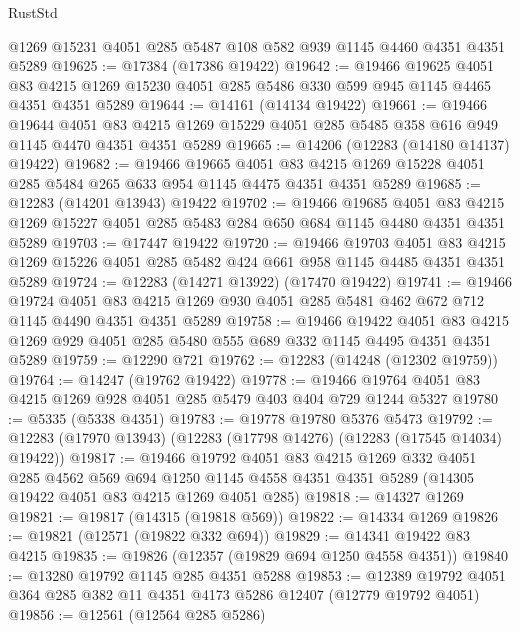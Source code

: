 \begin{lexlean}{RustStd}
\begin{coremodule}
    @1269
    @15231
    @4051
    @285
    @5487
    @108
    @582
    @939
    @1145
    @4460
    @4351
    @4351
    @5289
@19625 := @17384 (@17386 @19422)
@19642 := @19466
    @19625
    @4051
    @83
    @4215
    @1269
    @15230
    @4051
    @285
    @5486
    @330
    @599
    @945
    @1145
    @4465
    @4351
    @4351
    @5289
@19644 := @14161 (@14134 @19422)
@19661 := @19466
    @19644
    @4051
    @83
    @4215
    @1269
    @15229
    @4051
    @285
    @5485
    @358
    @616
    @949
    @1145
    @4470
    @4351
    @4351
    @5289
@19665 := @14206 (@12283 (@14180 @14137) @19422)
@19682 := @19466
    @19665
    @4051
    @83
    @4215
    @1269
    @15228
    @4051
    @285
    @5484
    @265
    @633
    @954
    @1145
    @4475
    @4351
    @4351
    @5289
@19685 := @12283 (@14201 @13943) @19422
@19702 := @19466
    @19685
    @4051
    @83
    @4215
    @1269
    @15227
    @4051
    @285
    @5483
    @284
    @650
    @684
    @1145
    @4480
    @4351
    @4351
    @5289
@19703 := @17447 @19422
@19720 := @19466
    @19703
    @4051
    @83
    @4215
    @1269
    @15226
    @4051
    @285
    @5482
    @424
    @661
    @958
    @1145
    @4485
    @4351
    @4351
    @5289
@19724 := @12283 (@14271 @13922) (@17470 @19422)
@19741 := @19466
    @19724
    @4051
    @83
    @4215
    @1269
    @930
    @4051
    @285
    @5481
    @462
    @672
    @712
    @1145
    @4490
    @4351
    @4351
    @5289
@19758 := @19466
    @19422
    @4051
    @83
    @4215
    @1269
    @929
    @4051
    @285
    @5480
    @555
    @689
    @332
    @1145
    @4495
    @4351
    @4351
    @5289
@19759 := @12290 @721
@19762 := @12283 (@14248 (@12302 @19759))
@19764 := @14247 (@19762 @19422)
@19778 := @19466 @19764 @4051 @83 @4215 @1269 @928 @4051 @285 @5479 @403 @404 @729 @1244 @5327
@19780 := @5335 (@5338 @4351)
@19783 := @19778 @19780 @5376 @5473
@19792 := @12283 (@17970 @13943) (@12283 (@17798 @14276) (@12283 (@17545 @14034) @19422))
@19817 := @19466
    @19792
    @4051
    @83
    @4215
    @1269
    @332
    @4051
    @285
    @4562
    @569
    @694
    @1250
    @1145
    @4558
    @4351
    @4351
    @5289
    (@14305 @19422 @4051 @83 @4215 @1269 @4051 @285)
@19818 := @14327 @1269
@19821 := @19817 (@14315 (@19818 @569))
@19822 := @14334 @1269
@19826 := @19821 (@12571 (@19822 @332 @694))
@19829 := @14341 @19422 @83 @4215
@19835 := @19826 (@12357 (@19829 @694 @1250 @4558 @4351))
@19840 := @13280 @19792 @1145 @285 @4351 @5288
@19853 := @12389 @19792 @4051 @364 @285 @382 @11 @4351 @4173 @5286 @12407 (@12779 @19792 @4051)
@19856 := @12561 (@12564 @285 @5286)

\end{coremodule}
\end{lexlean}
